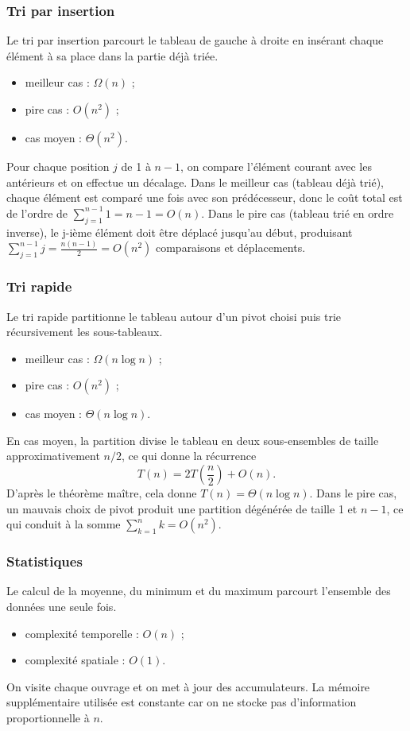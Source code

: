\documentclass[12pt,a4paper]{article}
\begin{document}
\subsubsection{Tri par insertion}
Le tri par insertion parcourt le tableau de gauche à droite en insérant chaque élément à sa place dans la partie déjà triée.
\begin{itemize}
  \item meilleur cas : $\Omega(n)$ ;
  \item pire cas : $O(n^2)$ ;
  \item cas moyen : $\Theta(n^2)$.
\end{itemize}
Pour chaque position $j$ de 1 à $n-1$, on compare l’élément courant avec les antérieurs et on effectue un décalage. Dans le meilleur cas (tableau déjà trié), chaque élément est comparé une fois avec son prédécesseur, donc le coût total est de l’ordre de $\sum_{j=1}^{n-1} 1 = n-1 = O(n)$. Dans le pire cas (tableau trié en ordre inverse), le j-ième élément doit être déplacé jusqu’au début, produisant $\sum_{j=1}^{n-1} j = \frac{n(n-1)}{2} = O(n^2)$ comparaisons et déplacements.

\subsubsection{Tri rapide}
Le tri rapide partitionne le tableau autour d’un pivot choisi puis trie récursivement les sous-tableaux.
\begin{itemize}
  \item meilleur cas : $\Omega(n \log n)$ ;
  \item pire cas : $O(n^2)$ ;
  \item cas moyen : $\Theta(n \log n)$.
\end{itemize}
En cas moyen, la partition divise le tableau en deux sous-ensembles de taille approximativement $n/2$, ce qui donne la récurrence
$$T(n) = 2T\left(\frac{n}{2}\right) + O(n).$$
D’après le théorème maître, cela donne $T(n)=\Theta(n\log n)$. Dans le pire cas, un mauvais choix de pivot produit une partition dégénérée de taille 1 et $n-1$, ce qui conduit à la somme $\sum_{k=1}^{n} k = O(n^2)$.

\subsubsection{Statistiques}
Le calcul de la moyenne, du minimum et du maximum parcourt l’ensemble des données une seule fois.
\begin{itemize}
  \item complexité temporelle : $O(n)$ ;
  \item complexité spatiale : $O(1)$.
\end{itemize}
On visite chaque ouvrage et on met à jour des accumulateurs. La mémoire supplémentaire utilisée est constante car on ne stocke pas d’information proportionnelle à $n$.
\end{document}
